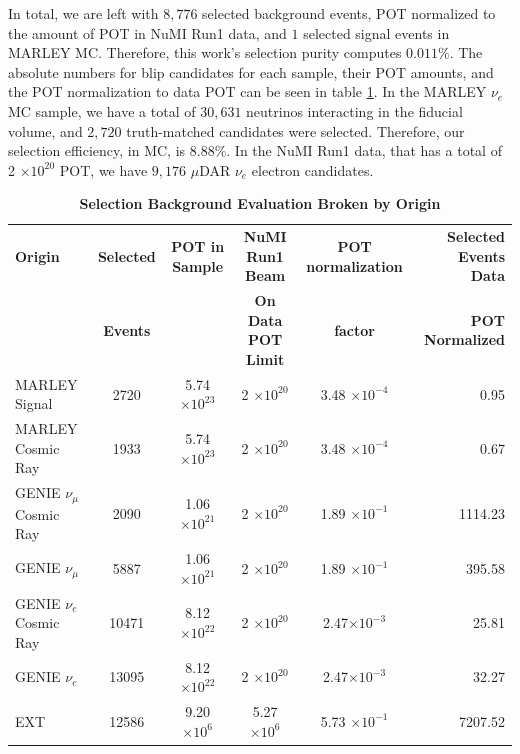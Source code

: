 In total, we are left with $8,776$ selected background events, POT normalized to the amount of POT in NuMI Run1 data, and $1$ selected signal events in MARLEY MC. Therefore, this work's selection purity computes $0.011\%$. The absolute numbers for blip candidates for each sample, their POT amounts, and the POT normalization to data POT can be seen in table \ref{bkg}. In the MARLEY $\nu_{e}$ MC sample, we have a total of $30,631$ neutrinos interacting in the fiducial volume, and $2,720$ truth-matched candidates were selected. Therefore, our selection efficiency, in MC, is $8.88\%$. In the NuMI Run1 data, that has a total of 2 $\times 10^{20}$ POT, we have $9,176$ $\mu$DAR $\nu_e$ electron candidates.   

\begin{table}[h!]
    \centering
    \begin{scriptsize}
	\begin{tabular}{lccccr}
		\hline
		\textbf{Origin} & \textbf{Selected}	&	\textbf{POT in Sample}	&	\textbf{NuMI Run1 Beam} & \textbf{POT normalization} & \textbf{Selected Events Data}\\
        & \textbf{Events} & & \textbf{On Data POT Limit} & \textbf{factor} & \textbf{POT Normalized}\\
		\toprule
		MARLEY Signal & 2720 & 5.74 $\times 10^{23}$ & 2 $\times 10^{20}$ & 3.48 $\times 10^{-4}$ & 0.95 \\ 
		MARLEY Cosmic Ray & 1933 & 5.74 $\times 10^{23}$ & 2 $\times 10^{20}$ & 3.48 $\times 10^{-4}$ & 0.67 \\
		GENIE  $\nu_{\mu}$ Cosmic Ray &  2090  &  1.06 $\times 10^{21}$  &  2 $\times 10^{20}$ &  1.89 $\times 10^{-1}$ & 1114.23 \\ 
        GENIE  $\nu_{\mu}$ & 5887 & 1.06 $\times 10^{21}$ & 2 $\times 10^{20}$ & 1.89 $\times 10^{-1}$ & 395.58 \\
        GENIE  $\nu_{e}$ Cosmic Ray & 10471 & 8.12 $\times 10^{22}$ & 2 $\times 10^{20}$ & 2.47$\times 10^{-3}$ & 25.81 \\
        GENIE  $\nu_{e}$ & 13095 & 8.12 $\times 10^{22}$ & 2 $\times 10^{20}$ & 2.47$\times 10^{-3}$ & 32.27 \\
        EXT & 12586 & 9.20 $\times 10^{6}$ & 5.27 $\times 10^{6}$ & 5.73 $\times 10^{-1}$ & 7207.52 \\
		\hline
	\end{tabular}
    \end{scriptsize}
	\caption[Selection Background Evaluation]{{\textbf{Selection Background Evaluation Broken by Origin}}}
    \label{bkg}
\end{table}


